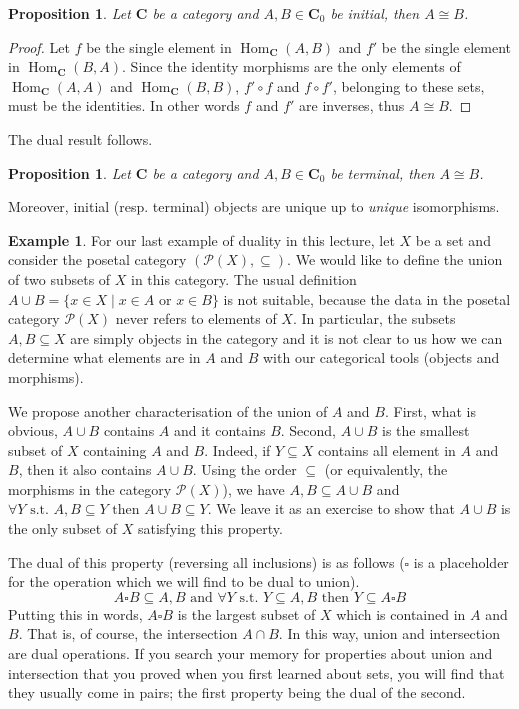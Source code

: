 \documentclass{article}
\newtheorem{prop}[thm]{Proposition}
\theoremstyle{definition}
\newtheorem{exmp}[thm]{Example}
\theoremstyle{remark}
\newcommand{\mP}{\mathcal{P}}
\DeclareMathOperator{\Hom}{Hom}
\begin{document}
\begin{prop}
	Let $\mathbf{C}$ be a category and $A,B\in \mathbf{C}_0$ be initial, then $A \cong B$.
\end{prop}
\begin{proof}
	Let $f$ be the single element in $\Hom_{\mathbf{C}}(A,B)$ and $f'$ be the single element in $\Hom_{\mathbf{C}}(B,A)$. Since the identity morphisms are the only elements of $\Hom_{\mathbf{C}}(A,A)$ and $\Hom_{\mathbf{C}}(B,B)$, $f' \circ f$ and $f\circ f'$, belonging to these sets, must be the identities. In other words $f$ and $f'$ are inverses, thus $A \cong B$. 
\end{proof}
The dual result follows.
\begin{prop}
	Let $\mathbf{C}$ be a category and $A,B \in \mathbf{C}_0$ be terminal, then $A \cong B$.
\end{prop}
Moreover, initial (resp. terminal) objects are unique up to \textit{unique} isomorphisms.%

\begin{exmp}
For our last example of duality in this lecture, let $X$ be a set and consider the posetal category $(\mP(X), \subseteq)$. We would like to define the union of two subsets of $X$ in this category. The usual definition $A \cup B = \{x \in X \mid x \in A \text{ or } x \in B\}$ is not suitable, because the data in the posetal category $\mP(X)$ never refers to elements of $X$. In particular, the subsets $A,B \subseteq X$ are simply objects in the category and it is not clear to us how we can determine what elements are in $A$ and $B$ with our categorical tools (objects and morphisms).

We propose another characterisation of the union of $A$ and $B$. First, what is obvious, $A \cup B$ contains $A$ and it contains $B$. Second, $A \cup B$ is the smallest subset of $X$ containing $A$ and $B$. Indeed, if $Y \subseteq X$ contains all element in $A$ and $B$, then it also contains $A \cup B$. Using the order $\subseteq$ (or equivalently, the morphisms in the category $\mP(X)$), we have $A, B \subseteq A\cup B$ and $\forall Y \text{ s.t. } A, B \subseteq Y \text{ then } A\cup B \subseteq Y$. We leave it as an exercise to show that $A \cup B$ is the only subset of $X$ satisfying this property.

The dual of this property (reversing all inclusions) is as follows ($\square$ is a placeholder for the operation which we will find to be dual to union).
\[ A \square B \subseteq A, B \text{ and } \forall Y \text{ s.t. } Y \subseteq A,B \text{ then } Y \subseteq A \square B\]
Putting this in words, $A \square B$ is the largest subset of $X$ which is contained in $A$ and $B$. That is, of course, the intersection $A \cap B$. In this way, union and intersection are dual operations. If you search your memory for properties about union and intersection that you proved when you first learned about sets, you will find that they usually come in pairs; the first property being the dual of the second.
\end{exmp}
\end{document}
